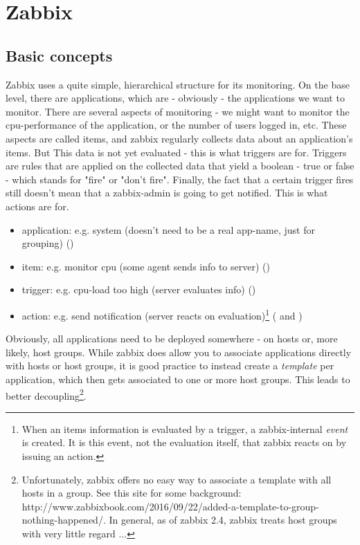 \section{Zabbix}


\subsection{Basic concepts}

Zabbix uses a quite simple, hierarchical structure for its monitoring. On the base level, there are applications, which are - obviously - the applications we want to monitor. 
There are several aspects of monitoring - we might want to monitor the cpu-performance of the application, or the number of users logged in, etc. These aspects are called items, and zabbix regularly collects data about an application's items. But This data is not yet evaluated - this is what triggers are for. Triggers are rules that are applied on the collected data that yield a boolean - true or false - which stands for "fire" or "don't fire". Finally, the fact that a certain trigger fires still doesn't mean that a zabbix-admin is going to get notified. This is what actions are for. 

\begin{itemize}
    \item application: e.g. system (doesn't need to be a real app-name, just for grouping) ()
    \item item: e.g. monitor cpu (some agent sends info to server) ()
    \item trigger: e.g. cpu-load too high (server evaluates info) ()
    \item action: e.g. send notification (server reacts on evaluation)\footnote{When an items information is evaluated by a trigger, a zabbix-internal \emph{event} is created. It is this event, not the evaluation itself, that zabbix reacts on by issuing an action.} ( and )
\end{itemize}

Obviously, all applications need to be deployed somewhere - on hosts or, more likely, host groups. While zabbix does allow you to associate applications directly with hosts or host groups, it is good practice to instead create a \emph{template} per application, which then gets associated to one or more host groups. This leads to better decoupling\footnote{Unfortunately, zabbix offers no easy way to associate a template with all hosts in a group. See this site for some background: http://www.zabbixbook.com/2016/09/22/added-a-template-to-group-nothing-happened/. In general, as of zabbix 2.4, zabbix treats host groups with very little regard ...}. 

